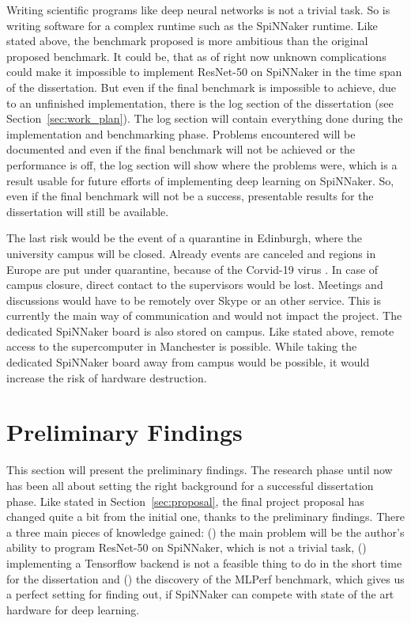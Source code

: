 \documentclass{article}
\begin{document}
Writing scientific programs like deep neural networks is
not a trivial task.
So is writing software for a complex runtime such as the
SpiNNaker runtime.
Like stated above, the benchmark proposed is more ambitious
than the original proposed benchmark.
It could be, that as of right now unknown complications
could make it impossible to implement ResNet-50 on
SpiNNaker in the time span of the dissertation.
But even if the final benchmark is impossible to achieve,
due to an unfinished implementation, there is the log
section of the dissertation (see
Section~\ref{sec:work_plan}).
The log section will contain everything done during the
implementation and benchmarking phase.
Problems encountered will be documented and even if the
final benchmark will not be achieved or the performance is
off, the log section will show where the problems were,
which is a result usable for future efforts of implementing
deep learning on SpiNNaker.
So, even if the final benchmark will not be a success,
presentable results for the dissertation will still be
available.

The last risk would be the event of a quarantine in Edinburgh,
where the university campus will be closed.
Already events are canceled and regions in Europe are put under
quarantine, because of the Corvid-19 virus
\citep{borghese_et_al_2020}.
In case of campus closure, direct contact to the supervisors would be
lost.
Meetings and discussions would have to be remotely over Skype or an
other service.
This is currently the main way of communication and would not impact
the project.
The dedicated SpiNNaker board is also stored on campus.
Like stated above, remote access to the supercomputer in Manchester
is possible.
While taking the dedicated SpiNNaker board away from campus would be
possible, it would increase the risk of hardware destruction.


\section{Preliminary Findings} %
\label{sec:prelim}

This section will present the preliminary findings.
The research phase until now has been all about setting the
right background for a successful dissertation phase.
Like stated in Section~\ref{sec:proposal}, the final
project proposal has changed quite a bit from the initial
one, thanks to the preliminary findings.
There a three main pieces of knowledge gained:
() the main problem will be the author's ability to
program ResNet-50 on SpiNNaker, which is not a trivial task,
() implementing a Tensorflow backend is not a feasible
thing to do in the short time for the dissertation and
() the discovery of the MLPerf benchmark,
which gives us a perfect setting for finding out, if
SpiNNaker can compete with state of the art hardware for
deep learning.
\end{document}
